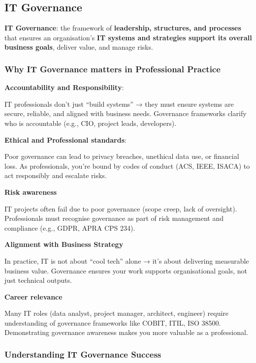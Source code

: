 \subsection{IT Governance}

\indent 

\noindent \textbf{IT Governance}: the framework of \textbf{leadership, structures, and processes} that ensures an organisation’s \textbf{IT systems and strategies support its overall business goals}, deliver value, and manage risks.

\subsubsection{Why IT Governance matters in Professional Practice}

\indent 

\noindent\textbf{Accountability and Responsibility}: 

IT professionals don’t just “build systems” → they must ensure systems are secure, reliable, and aligned with business needs. Governance frameworks clarify who is accountable (e.g., CIO, project leads, developers).

\noindent\textbf{Ethical and Professional standards}:

Poor governance can lead to privacy breaches, unethical data use, or financial loss. As professionals, you’re bound by codes of conduct (ACS, IEEE, ISACA) to act responsibly and escalate risks.

\noindent\textbf{Risk awareness}

IT projects often fail due to poor governance (scope creep, lack of oversight). Professionals must recognise governance as part of risk management and compliance (e.g., GDPR, APRA CPS 234).

\noindent\textbf{Alignment with Business Strategy}

In practice, IT is not about “cool tech” alone → it’s about delivering measurable business value. Governance ensures your work supports organisational goals, not just technical outputs.

\noindent\textbf{Career relevance}

Many IT roles (data analyst, project manager, architect, engineer) require understanding of governance frameworks like COBIT, ITIL, ISO 38500. Demonstrating governance awareness makes you more valuable as a professional.

\subsubsection{Understanding IT Governance Success}

